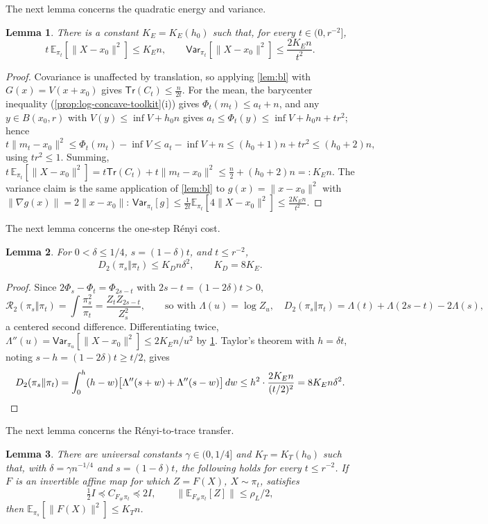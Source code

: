 \documentclass[11pt]{article}
\numberwithin{equation}{section}
\newtheorem{lemma}{Lemma}[section]
\theoremstyle{definition}
\newcommand{\E}[2]{\mathbb{E}_{#1}\left[#2\right]}
\newcommand{\V}[2]{\mathsf{Var}_{#1}\left[#2\right]}
\newcommand{\Tr}[1]{\mathsf{Tr}\left(#1\right)}
\begin{document}
The next lemma concerns the quadratic energy and variance.

\begin{lemma}
\label{lem:energy}
There is a constant $K_E=K_E(h_0)$ such that, for every
$t\in(0,r^{-2}]$,
\[
t\,\E{\pi_t}{\|X-x_0\|^2}\leq K_En,
\qquad
\V{\pi_t}{\|X-x_0\|^2}\leq\frac{2K_En}{t^2}.
\]
\end{lemma}

\begin{proof}
Covariance is unaffected by translation, so applying \cref{lem:bl} with
$G(x)=V(x+x_0)$ gives
$\Tr{C_t}\leq\frac{n}{2t}$.
For the mean, the barycenter inequality (\cref{prop:log-concave-toolkit}(i))
gives $\Phi_t(m_t)\leq a_t+n$, and any
$y\in B(x_0,r)$ with
$V(y)\leq\inf V+h_0n$ gives
$a_t\leq\Phi_t(y)\leq\inf V+h_0n+tr^2$; hence
\[
t\|m_t-x_0\|^2
\leq\Phi_t(m_t)-\inf V
\leq a_t-\inf V+n
\leq(h_0+1)n+tr^2
\leq(h_0+2)n ,
\]
using $tr^2\leq1$.
Summing,
$t\,\E{\pi_t}{\|X-x_0\|^2} =t\Tr{C_t}+t\|m_t-x_0\|^2 \leq\frac n2+(h_0+2)n=:K_En$.
The variance claim is the same application of \cref{lem:bl} to
$g(x)=\|x-x_0\|^2$ with
$\|\nabla g(x)\|=2\|x-x_0\|$:
$\V{\pi_t}{g}\leq\frac1{2t}\E{\pi_t}{4\|X-x_0\|^2} \leq\frac{2K_En}{t^2}$.
\end{proof}

The next lemma concerns the one-step R\'enyi cost.

\begin{lemma}
\label{lem:renyi}
For $0<\delta\leq1/4$,
$s=(1-\delta)t$, and
$t\leq r^{-2}$,
\[
D_2(\pi_s\Vert\pi_t)\leq K_Dn\delta^2,
\qquad
K_D=8K_E .
\]
\end{lemma}

\begin{proof}
Since $2\Phi_s-\Phi_t=\Phi_{2s-t}$ with
$2s-t=(1-2\delta)t>0$,
\[
\mathcal R_2(\pi_s\Vert\pi_t)
=\int\frac{\pi_s^2}{\pi_t}
=\frac{Z_tZ_{2s-t}}{Z_s^2},
\qquad
\text{so with }\Lambda(u)=\log Z_u,
\quad
D_2(\pi_s\Vert\pi_t)=\Lambda(t)+\Lambda(2s-t)-2\Lambda(s),
\]
a centered second difference.
Differentiating twice, $\Lambda''(u)=\V{\pi_u}{\|X-x_0\|^2}\leq2K_En/u^2$ by
\cref{lem:energy}.
Taylor's theorem with $h=\delta t$, noting
$s-h=(1-2\delta)t\geq t/2$, gives
\[
D_2(\pi_s\Vert\pi_t)
=\int_0^h(h-w)\bigl[\Lambda''(s+w)+\Lambda''(s-w)\bigr]\,dw
\leq h^2\cdot\frac{2K_En}{(t/2)^2}
=8K_En\delta^2.\qedhere
\]
\end{proof}

The next lemma concerns the R\'enyi-to-trace transfer.

\begin{lemma}
\label{lem:renyi-trace}
There are universal constants $\gamma\in(0,1/4]$ and
$K_T=K_T(h_0)$ such that, with
$\delta=\gamma n^{-1/4}$ and
$s=(1-\delta)t$, the following holds for every
$t\leq r^{-2}$.
If $F$ is an invertible affine map for which
$Z=F(X)$,
$X\sim\pi_t$, satisfies
\[
\tfrac12I
\preceq C_{F_\#\pi_t}
\preceq2I,
\qquad
\|\E{F_\#\pi_t}{Z}\|\leq\rho_L/2,
\]
then $\E{\pi_s}{\|F(X)\|^2}\leq K_Tn$.
\end{lemma}
\end{document}
